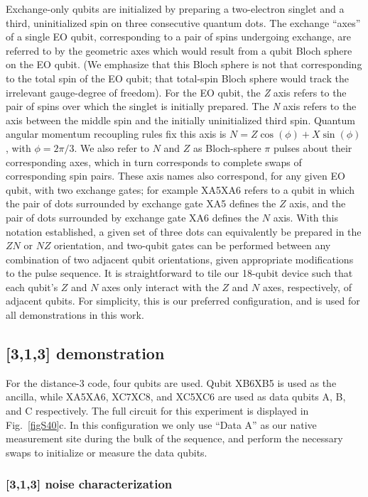 \documentclass[aps,prl,twocolumn,superscriptaddress,nobibnotes,10pt,floatfix]{revtex4-2}
\newcommand{\figref}[1]{Fig.~\ref{#1}}
\begin{document}
Exchange-only qubits are initialized by preparing a two-electron singlet and a third, uninitialized spin on three consecutive quantum dots.
The exchange ``axes'' of a single EO qubit, corresponding to a pair of spins undergoing exchange, are referred to by the geometric axes which would result from a qubit Bloch sphere on the EO qubit.
(We emphasize that this Bloch sphere is not that corresponding to the total spin of the EO qubit; that total-spin Bloch sphere would track the irrelevant gauge-degree of freedom).
For the EO qubit, the \emph{Z} axis refers to the pair of spins over which the singlet is initially prepared.
The \emph{N} axis refers to the axis between the middle spin and the initially uninitialized third spin.
Quantum angular momentum recoupling rules fix this axis is $N = Z\cos(\phi) + X\sin(\phi)$, with $\phi=2π/3$.
We also refer to $N$ and $Z$ as Bloch-sphere $\pi$ pulses about their corresponding axes, which in turn corresponds to complete swaps of corresponding spin pairs.
These axis names also correspond, for any given EO qubit, with two exchange gates; for example XA5XA6 refers to a qubit in which the pair of dots surrounded by exchange gate XA5 defines the $Z$ axis, and the pair of dots surrounded by exchange gate XA6 defines the $N$ axis.
With this notation established, a given set of three dots can equivalently be prepared in the $ZN$ or $NZ$ orientation, and two-qubit gates can be performed between any combination of two adjacent qubit orientations, given appropriate modifications to the pulse sequence.
It is straightforward to tile our 18-qubit device such that each qubit's $Z$ and $N$ axes only interact with the $Z$ and $N$ axes, respectively, of adjacent qubits.
For simplicity, this is our preferred configuration, and is used for all demonstrations in this work.

\subsection{{[}3,1,3{]} demonstration}\label{demonstration-313}

For the distance-3 code, four qubits are used.
Qubit XB6XB5 is used as the ancilla, while XA5XA6, XC7XC8, and XC5XC6 are used as data qubits A, B, and C respectively.
The full circuit for this experiment is displayed in \figref{figS40}c.
In this configuration we only use ``Data A'' as our native measurement site during the bulk of the sequence, and perform the necessary swaps to initialize or measure the data qubits.


\subsubsection{{[}3,1,3{]} noise characterization}\label{noise-characterization-313}
\end{document}
